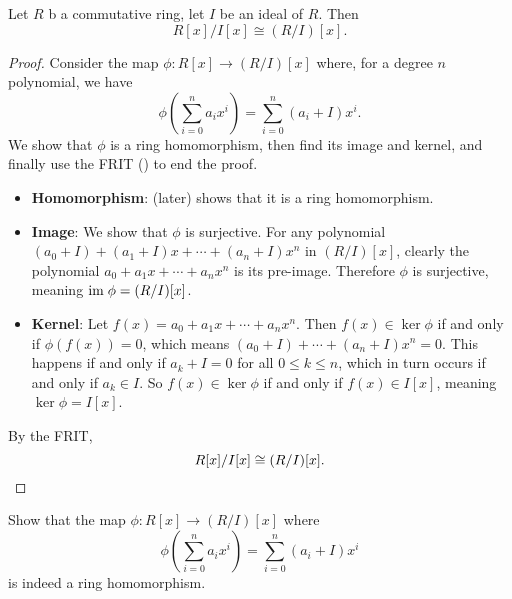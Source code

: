 \begin{proposition}\label{prop-polynomial-ring-quotient-ideal-polynomial-ring-cong-quotient-polynomial-ring}
    Let $R$ b a commutative ring, let $I$ be an ideal of $R$. Then
    \[
        R[x]/I[x] \cong (R/I)[x].
    \]
\end{proposition}
\begin{proof}
    Consider the map $\phi: R[x] \to (R/I)[x]$ where, for a degree $n$ polynomial, we have
    \[
        \phi\left(\sum_{i=0}^na_ix^i\right) = \sum_{i=0}^n (a_i+I)x^i.
    \]
    We show that $\phi$ is a ring homomorphism, then find its image and kernel, and finally use the FRIT () to end the proof.
    \begin{itemize}
        \item \textbf{Homomorphism}:  (later) shows that it is a ring homomorphism.
        
        \item \textbf{Image}: We show that $\phi$ is surjective. For any polynomial $(a_0+I) + (a_1+I)x + \cdots + (a_n+I)x^n$ in $(R/I)[x]$, clearly the polynomial $a_0 + a_1x + \cdots + a_nx^n$ is its pre-image. Therefore $\phi$ is surjective, meaning $\mathrm{im}\; \phi = (R/I)[x]$.
        
        \item \textbf{Kernel}: Let $f(x) = a_0 + a_1x + \cdots + a_nx^n$. Then $f(x) \in \ker\phi$ if and only if $\phi(f(x)) = 0$, which means $(a_0+I) + \cdots + (a_n+I)x^n = 0$. This happens if and only if $a_k + I = 0$ for all $0 \leq k \leq n$, which in turn occurs if and only if $a_k \in I$. So $f(x) \in \ker\phi$ if and only if $f(x) \in I[x]$, meaning $\ker\phi = I[x]$.
    \end{itemize}
    By the FRIT,
    \[
        R[x]/I[x] \cong (R/I)[x].\qedhere
    \]
\end{proof}

\begin{exercise}\label{exercise-polynomial-ring-maps-to-quotient-polynomial-ring-is-homomorphism}
    Show that the map $\phi: R[x] \to (R/I)[x]$ where
    \[
        \phi\left(\sum_{i=0}^na_ix^i\right) = \sum_{i=0}^n (a_i+I)x^i
    \]
    is indeed a ring homomorphism.
\end{exercise}

